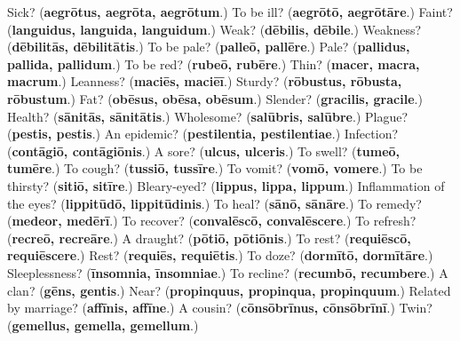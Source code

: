 \begin{tcolorbox}[breakable,colback=teal!4,colframe=teal!35!black,title={Before you move on}]
Sick? (\textbf{aegrōtus, aegrōta, aegrōtum}.) To be ill? (\textbf{aegrōtō, aegrōtāre}.) Faint? (\textbf{languidus, languida, languidum}.) Weak? (\textbf{dēbilis, dēbile}.) Weakness? (\textbf{dēbilitās, dēbilitātis}.) To be pale? (\textbf{palleō, pallēre}.) Pale? (\textbf{pallidus, pallida, pallidum}.) To be red? (\textbf{rubeō, rubēre}.) Thin? (\textbf{macer, macra, macrum}.) Leanness? (\textbf{maciēs, maciēī}.) Sturdy? (\textbf{rōbustus, rōbusta, rōbustum}.) Fat? (\textbf{obēsus, obēsa, obēsum}.) Slender? (\textbf{gracilis, gracile}.) Health? (\textbf{sānitās, sānitātis}.) Wholesome? (\textbf{salūbris, salūbre}.) Plague? (\textbf{pestis, pestis}.) An epidemic? (\textbf{pestilentia, pestilentiae}.) Infection? (\textbf{contāgiō, contāgiōnis}.) A sore? (\textbf{ulcus, ulceris}.) To swell? (\textbf{tumeō, tumēre}.) To cough? (\textbf{tussiō, tussīre}.) To vomit? (\textbf{vomō, vomere}.) To be thirsty? (\textbf{sitiō, sitīre}.) Bleary-eyed? (\textbf{lippus, lippa, lippum}.) Inflammation of the eyes? (\textbf{lippitūdō, lippitūdinis}.) To heal? (\textbf{sānō, sānāre}.) To remedy? (\textbf{medeor, medērī}.) To recover? (\textbf{convalēscō, convalēscere}.) To refresh? (\textbf{recreō, recreāre}.) A draught? (\textbf{pōtiō, pōtiōnis}.) To rest? (\textbf{requiēscō, requiēscere}.) Rest? (\textbf{requiēs, requiētis}.) To doze? (\textbf{dormītō, dormītāre}.) Sleeplessness? (\textbf{īnsomnia, īnsomniae}.) To recline? (\textbf{recumbō, recumbere}.) A clan? (\textbf{gēns, gentis}.) Near? (\textbf{propinquus, propinqua, propinquum}.) Related by marriage? (\textbf{affīnis, affīne}.) A cousin? (\textbf{cōnsōbrīnus, cōnsōbrīnī}.) Twin? (\textbf{gemellus, gemella, gemellum}.)
\end{tcolorbox}
